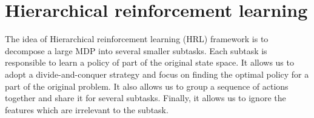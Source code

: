 
\section{Hierarchical reinforcement learning}
\label{se:HRL}
The idea of Hierarchical reinforcement learning (HRL) framework is to decompose
a large MDP into several smaller subtasks. Each subtask is responsible to
learn a policy of part of the original state space.
It allows us to adopt a divide-and-conquer
strategy and focus on finding the optimal policy for a part of
the original problem.
It also allows us to group a sequence of actions together and share
it for several subtasks. Finally, it allows us to ignore the features which
are irrelevant to the subtask.


